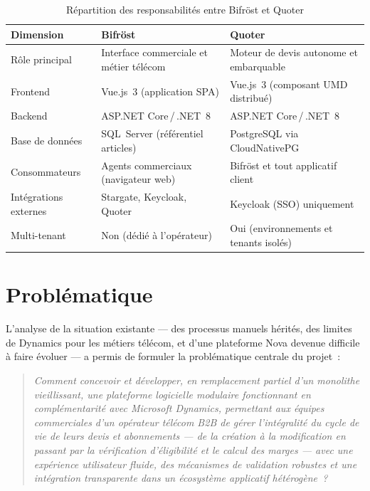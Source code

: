 \begin{table}[H]
\caption{R\'epartition des responsabilit\'es entre Bifr\"ost et Quoter}
\label{tab:separation_Bifröst_quoter}
\centering
\renewcommand{\arraystretch}{1.55}
\begin{tabular}{|>{\raggedright\arraybackslash}p{4cm}|>{\raggedright\arraybackslash}p{4.5cm}|>{\raggedright\arraybackslash}p{4.5cm}|}
\hline
\rowcolor{gray!15}
\textbf{Dimension} & \textbf{Bifr\"ost} & \textbf{Quoter} \\
\hline
R\^ole principal & Interface commerciale et m\'etier t\'el\'ecom & Moteur de devis autonome et embarquable \\
\hline
Frontend & Vue.js~3 (application SPA) & Vue.js~3 (composant UMD distribu\'e) \\
\hline
Backend & ASP.NET Core\,/\,.NET~8 & ASP.NET Core\,/\,.NET~8 \\
\hline
Base de donn\'ees & SQL~Server (r\'ef\'erentiel articles) & PostgreSQL via CloudNativePG \\
\hline
Consommateurs & Agents commerciaux (navigateur web) & Bifr\"ost et tout applicatif client \\
\hline
Int\'egrations externes & Stargate, Keycloak, Quoter & Keycloak (SSO) uniquement \\
\hline
Multi-tenant & Non (d\'edi\'e \`a l'op\'erateur) & Oui (environnements et tenants isol\'es) \\
\hline
\end{tabular}
\end{table}

\section{Probl\'ematique}

L'analyse de la situation existante --- des processus manuels h\'erit\'es, des limites de Dynamics pour les m\'etiers t\'el\'ecom, et d'une plateforme Nova devenue difficile \`a faire \'evoluer --- a permis de formuler la probl\'ematique centrale du projet~:

\begin{quote}
\itshape
Comment concevoir et d\'evelopper, en remplacement partiel d'un monolithe vieillissant, une plateforme logicielle modulaire fonctionnant en compl\'ementarit\'e avec Microsoft Dynamics, permettant aux \'equipes commerciales d'un op\'erateur t\'el\'ecom B2B de g\'erer l'int\'egralit\'e du cycle de vie de leurs devis et abonnements --- de la cr\'eation \`a la modification en passant par la v\'erification d'\'eligibilit\'e et le calcul des marges --- avec une exp\'erience utilisateur fluide, des m\'ecanismes de validation robustes et une int\'egration transparente dans un \'ecosyst\`eme applicatif h\'et\'erog\`ene~?
\end{quote}

